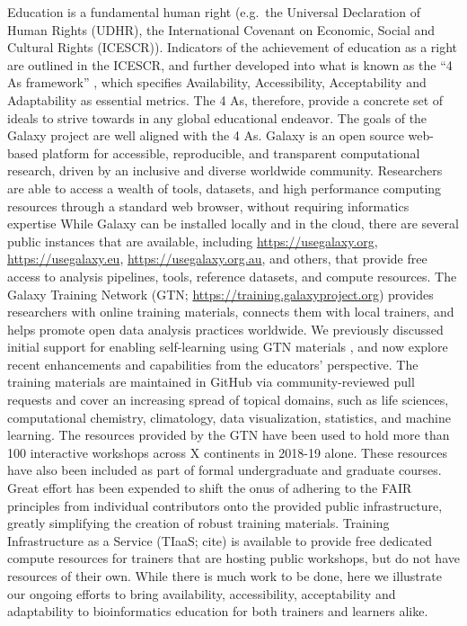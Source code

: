 \documentclass[10pt,letterpaper]{article}
\begin{document}
Education is a fundamental human right (e.g.\ the Universal Declaration of Human Rights (UDHR), the International Covenant on Economic, Social and Cultural Rights (ICESCR)).
Indicators of the achievement of education as a right are outlined in the ICESCR, and further developed into what is known as the “4 As framework” \cite{tomavsevski2001human}, which specifies Availability, Accessibility, Acceptability and Adaptability as essential metrics.
The 4 As, therefore, provide a concrete set of ideals to strive towards in any global educational endeavor.
The goals of the Galaxy project are well aligned with the 4 As.
Galaxy \cite{Afgan2018} is an open source web-based platform for accessible, reproducible, and transparent computational research, driven by an inclusive and diverse worldwide community. %
Researchers are able to access a wealth of tools, datasets, and high performance computing resources through a standard web browser, without requiring informatics expertise
While Galaxy can be installed locally and in the cloud, there are several public instances that are available, including \url{https://usegalaxy.org}, \url{https://usegalaxy.eu}, \url{https://usegalaxy.org.au}, and others, that provide free access to analysis pipelines, tools, reference datasets, and compute resources. %
The Galaxy Training Network (GTN; \url{https://training.galaxyproject.org}) provides researchers with online training materials, connects them with local trainers, and helps promote open data analysis practices worldwide. We previously discussed initial support for enabling self-learning using GTN materials \cite{Batut2018}, and now explore recent enhancements and capabilities from the educators’ perspective.
The training materials are maintained in GitHub via community-reviewed pull requests and cover an increasing spread of topical domains, such as life sciences, computational chemistry, climatology, data visualization, statistics, and machine learning. %
The resources provided by the GTN have been used to hold more than 100 interactive workshops across X continents in 2018-19 alone.%
These resources have also been included as part of formal undergraduate and graduate courses. Great effort has been expended to shift the onus of adhering to the FAIR principles \cite{Wilkinson2016} from individual contributors onto the provided public infrastructure, greatly simplifying the creation of robust training materials.
Training Infrastructure as a Service (TIaaS; cite) is available to provide free dedicated compute resources for trainers that are hosting public workshops, but do not have resources of their own.
While there is much work to be done, here we illustrate our ongoing efforts to bring availability, accessibility, acceptability and adaptability to bioinformatics education for both trainers and learners alike.
\end{document}
